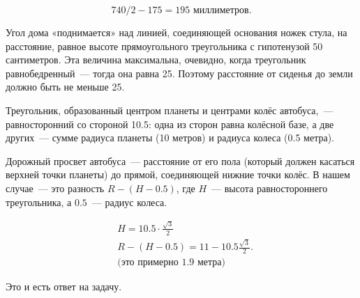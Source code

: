 \begin{itemize}

\itA $$740/2-175 = 195\text{\ миллиметров.}$$

\itB Угол дома «поднимается» над линией, соединяющей основания ножек стула, на расстояние, равное высоте прямоугольного треугольника с гипотенузой 50 сантиметров. Эта величина максимальна, очевидно, когда треугольник равнобедренный~— тогда она равна \SI{25}{}. Поэтому расстояние от сиденья до земли должно быть не меньше \SI{25}{}.

\begin{center}  \end{center}

\itC Треугольник, образованный центром планеты и центрами колёс автобуса,~— равносторонний со стороной \SI{10.5}{}: одна из сторон равна колёсной базе, а две других~— сумме радиуса планеты (10 метров) и радиуса колеса (0.5 метра).

\begin{center}
\end{center}

Дорожный просвет автобуса~— расстояние от его пола (который должен касаться верхней точки планеты) до прямой, соединяющей нижние точки колёс. В нашем случае~— это разность $R-(H-0.5)$, где $H$~— высота равностороннего треугольника, а $0.5$~— радиус колеса.

\begin{align*}
	& H = 10.5 \cdot \frac{\sqrt{3}}{2} \\
	& R-(H-0.5) = 11 - 10.5\frac{\sqrt{3}}{2}. \\
	& \text{(это примерно 1.9 метра)}
\end{align*}

Это и есть ответ на задачу.
\end{itemize}